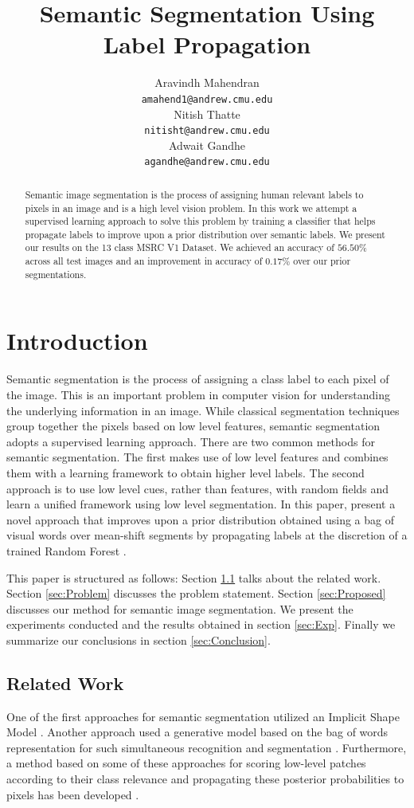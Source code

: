 \documentclass{article} %
\title{Semantic Segmentation Using Label Propagation}
\author{
Aravindh Mahendran \\
\texttt{amahend1@andrew.cmu.edu} \\ 
\And
Nitish Thatte \\
\texttt{nitisht@andrew.cmu.edu} \\
\AND
Adwait Gandhe \\
\texttt{agandhe@andrew.cmu.edu} \\
}
\begin{document}
\maketitle

\begin{abstract}
Semantic image segmentation is the process of assigning human relevant labels to pixels in an image and is a high level vision problem. In this work we attempt a supervised learning approach to solve this problem by training a classifier that helps propagate labels to improve upon a prior distribution over semantic labels. We present our results on the 13 class MSRC V1 Dataset. We achieved an accuracy of $56.50\%$ across all test images and an improvement in accuracy of $0.17\%$ over our prior segmentations.
\end{abstract}

\section{Introduction}
Semantic segmentation is the process of assigning a class label to each pixel of the image. This is an important problem in computer vision for understanding the underlying information in an image. While classical segmentation techniques group together the pixels based on low level features, semantic segmentation adopts a supervised learning approach. There are two common methods for semantic segmentation. The first makes use of low level features and combines them with a learning framework to obtain higher level labels. The second approach is to use low level cues, rather than features, with random fields and learn a unified framework using low level segmentation. In this paper, present a novel approach that improves upon a prior distribution obtained using a bag of visual words over mean-shift segments by propagating labels at the discretion of a trained Random Forest \cite{Statistics01randomforests}.

This paper is structured as follows: Section \ref{sec:Related} talks about the related work. Section \ref{sec:Problem} discusses the problem statement. Section \ref{sec:Proposed} discusses our method for semantic image segmentation. We present the experiments conducted and the results obtained in section \ref{sec:Exp}. Finally we summarize our conclusions in section \ref{sec:Conclusion}.
\label{sec:Intro}

\subsection{Related Work}
\label{sec:Related}
One of the first approaches for semantic segmentation utilized an Implicit Shape Model%
\cite{Leibe04combinedobject}. 
Another approach used a generative model based on the bag of words representation for such simultaneous recognition and segmentation \cite{cao:spatially}.  
Furthermore, a method based on some of these approaches for scoring low-level patches according to their class relevance and propagating these posterior probabilities to pixels has been developed \cite{conf/bmvc/CsurkaP08}.
\end{document}
